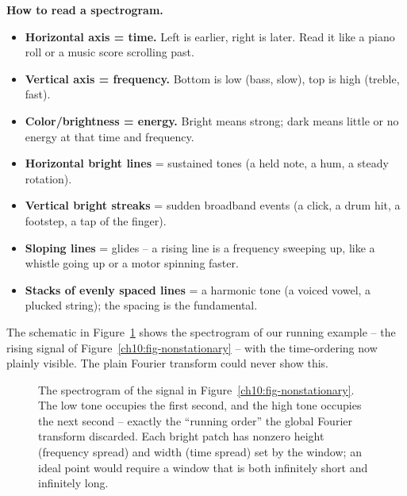 \begin{focusbox}
\textbf{How to read a spectrogram.}
\begin{itemize}
  \item \textbf{Horizontal axis = time.} Left is earlier, right is later. Read it
        like a piano roll or a music score scrolling past.
  \item \textbf{Vertical axis = frequency.} Bottom is low (bass, slow), top is
        high (treble, fast).
  \item \textbf{Color/brightness = energy.} Bright means strong; dark means
        little or no energy at that time and frequency.
  \item \textbf{Horizontal bright lines} = sustained tones (a held note, a hum, a
        steady rotation).
  \item \textbf{Vertical bright streaks} = sudden broadband events (a click, a
        drum hit, a footstep, a tap of the finger).
  \item \textbf{Sloping lines} = glides -- a rising line is a frequency sweeping
        up, like a whistle going up or a motor spinning faster.
  \item \textbf{Stacks of evenly spaced lines} = a harmonic tone (a voiced
        vowel, a plucked string); the spacing is the fundamental.
\end{itemize}
\end{focusbox}

The schematic in Figure~\ref{ch10:fig-specgram} shows the spectrogram of our
running example -- the rising signal of Figure~\ref{ch10:fig-nonstationary} --
with the time-ordering now plainly visible. The plain Fourier transform could
never show this.

\begin{figure}[H]
\centering
{}
\caption{The spectrogram of the signal in Figure~\ref{ch10:fig-nonstationary}.
The low tone occupies the first second, and the high tone occupies the next second --
exactly the ``running order'' the global Fourier transform discarded. Each bright
patch has nonzero height (frequency spread) and width (time spread) set by the
window; an ideal point would require a window that is both infinitely short and
infinitely long.}
\label{ch10:fig-specgram}
\end{figure}

